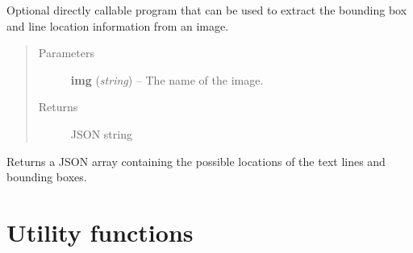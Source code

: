 \documentclass[letterpaper,10pt,english]{sphinxmanual}
\begin{document}
\begin{fulllineitems}
\label{code:getBoxes.getBoxesAndLines}
Optional directly callable program that can be used to extract the bounding box
and line location information from an image.
\begin{quote}\begin{description}
\item[{Parameters}] \leavevmode
\textbf{img} (\emph{string}) -- The name of the image.

\item[{Returns}] \leavevmode
JSON string

\end{description}\end{quote}

Returns a JSON array containing the possible locations of the text lines and 
bounding boxes.

\end{fulllineitems}



\section{Utility functions}
\label{code:module-OratUtils}\label{code:utility-functions}
\end{document}
